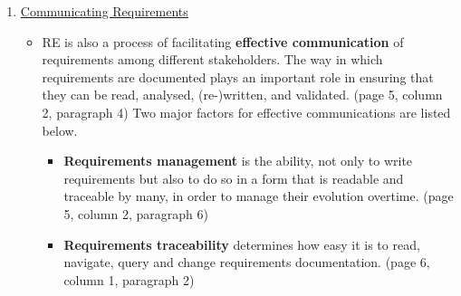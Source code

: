 \begin{enumerate}[a)]
\begin{enumerate}[1]
        \item \underline{Communicating Requirements}
        \begin{itemize}
            \item RE is also a process of facilitating \textbf{effective communication} of requirements   among different stakeholders. The way in which requirements are documented plays an important role in ensuring that they can be read, analysed, (re-)written, and validated. (page 5, column 2, paragraph 4)
            Two major factors for effective communications are listed below.
            \begin{itemize}
                \item \textbf{Requirements management} is the ability, not only to write requirements but also to do so in a form that is readable and traceable by many, in order to manage their evolution overtime. (page 5, column 2, paragraph 6)
                \item  \textbf{Requirements traceability} determines how easy it is to read,  navigate, query and change requirements documentation. (page 6, column 1, paragraph 2)
            \end{itemize}
        \end{itemize}
        

\end{enumerate}
\end{enumerate}
